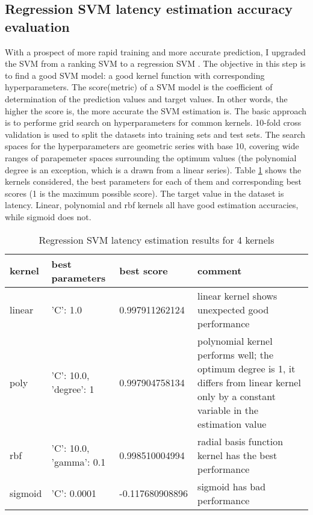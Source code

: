 \documentclass[12pt]{article}
\theoremstyle{definition}
\begin{document}
\subsection{Regression SVM latency estimation accuracy evaluation}
With a prospect of more rapid training and more accurate prediction, I upgraded the SVM from a ranking SVM to a regression SVM \cite{chang2011libsvm}. The objective in this step is to find a good SVM model: a good kernel function with corresponding hyperparameters. The score(metric) of a SVM model is the coefficient of determination of the prediction values and target values. In other words, the higher the score is, the more accurate the SVM estimation is. The basic approach is to performe grid search on hyperparameters for common kernels. 10-fold cross validation is used to split the datasets into training sets and test sets. The search spaces for the hyperparameters are geometric series with base 10, covering wide ranges of parapemeter spaces surrounding the optimum values (the polynomial degree is an exception, which is a drawn from a linear series). Table \ref{tab:latency} shows the kernels considered, the best parameters for each of them and corresponding best scores (1 is the maximum possible score). The target value in the dataset is latency. Linear, polynomial and rbf kernels all have good estimation accuracies, while sigmoid does not.
\begin{table}[htb]
  \centering
  \begin{tabularx}{\textwidth}{|l|l|l|X|} \hline
    kernel & best parameters & best score & comment \\ \hline
    linear & {'C': 1.0} & 0.997911262124 & linear kernel shows unexpected good performance \\ \hline
    poly & {'C': 10.0, 'degree': 1} & 0.997904758134 & polynomial kernel performs well; the optimum degree is 1, it differs from linear kernel only by a constant variable in the estimation value \\ \hline
    rbf & {'C': 10.0, 'gamma': 0.1} & 0.998510004994 & radial basis function kernel has the best performance \\ \hline
    sigmoid & {'C': 0.0001} & -0.117680908896 & sigmoid has bad performance \\ \hline
  \end{tabularx}
  \caption{Regression SVM latency estimation results for 4 kernels}
  \label{tab:latency}
\end{table}
\end{document}
